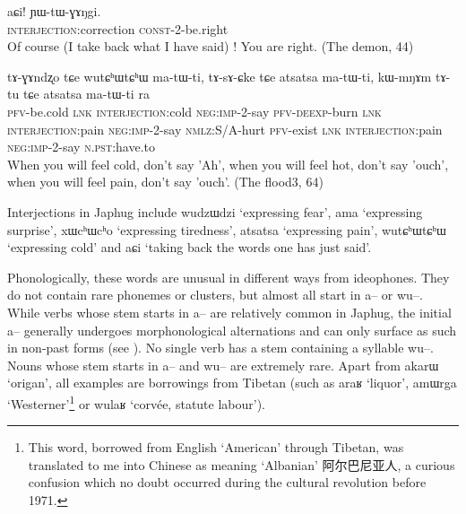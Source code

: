 \documentclass[oldfontcommands,oneside,a4paper,11pt]{article}
\newcommand{\ipa}[1]{{\phon \mbox{#1}}} %
\newcommand{\zh}[1]{{\cn #1}}
\begin{document}
       \begin{exe}
\ex \label{ex:aCi}
\gll 
\ipa{aɕi!} 	\ipa{ɲɯ-tɯ-ɣɤŋgi.} \\
\textsc{interjection}:correction \textsc{const}-2-be.right \\
\glt Of course (I take back what I have said) ! You are right. (The demon, 44)
\end{exe}
      \begin{exe}
\ex \label{ex:atsatsa}
\gll 
 	\ipa{tɤ-ɣɤndʐo} 	\ipa{tɕe} 	\ipa{wutɕʰɯtɕʰɯ} 	\ipa{ma-tɯ-ti,} 	\ipa{tɤ-sɤ-ɕke} 	\ipa{tɕe} 	 	\ipa{atsatsa} 	\ipa{ma-tɯ-ti,}  \ipa{kɯ-mŋɤm} 	\ipa{tɤ-tu} 	\ipa{tɕe} 	\ipa{atsatsa} 	\ipa{ma-tɯ-ti} 	\ipa{ra} \\
 	\textsc{pfv}-be.cold \textsc{lnk} \textsc{interjection}:cold \textsc{neg:imp}-2-say \textsc{pfv-deexp}-burn \textsc{lnk} \textsc{interjection}:pain \textsc{neg:imp}-2-say \textsc{nmlz}:S/A-hurt \textsc{pfv}-exist \textsc{lnk} \textsc{interjection}:pain \textsc{neg:imp}-2-say \textsc{n.pst}:have.to  	\\
\glt When you will feel cold, don't say 'Ah', when you will feel hot, don't say 'ouch', when you will feel pain, don't say 'ouch'. (The flood3, 64)
\end{exe}
  
 Interjections in Japhug include  \ipa{wudzɯdzi} `expressing fear',  \ipa{ama} `expressing surprise', \ipa{xɯcʰɯcʰo} `expressing tiredness', \ipa{atsatsa} `expressing pain', \ipa{wutɕʰɯtɕʰɯ} `expressing cold' and \ipa{aɕi} `taking back the words one has just said'.
 
 Phonologically, these words are unusual in different ways from ideophones. They do not contain rare phonemes or clusters, but almost all start in \ipa{a--} or \ipa{wu--}. While verbs whose stem starts  in \ipa{a--} are relatively common in Japhug, the initial \ipa{a--} generally undergoes   morphonological alternations and can only surface as such in non-past forms (see \citealt{jacques07passif}).  No   single verb has a stem containing  a syllable \ipa{wu--}. Nouns whose stem starts in \ipa{a--} and \ipa{wu--}   are extremely rare. Apart from \ipa{akarɯ} `origan', all examples are borrowings from Tibetan (such as \ipa{araʁ} `liquor', \ipa{amɯrga} `Westerner'\footnote{This word, borrowed from English `American' through Tibetan, was translated to me into Chinese as meaning `Albanian' \zh{阿尔巴尼亚人},  a curious confusion which no doubt occurred during the cultural revolution before 1971.} or \ipa{wulaʁ} `corvée, statute labour').
\end{document}
